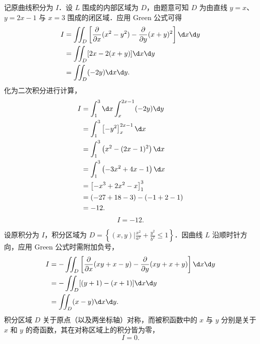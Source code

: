 \begin{solution}

    记原曲线积分为 $I$．设 $L$ 围成的内部区域为 $D$，由题意可知 $D$ 为由直线 $y=x$、$y=2x-1$ 与 $x=3$ 围成的闭区域．应用 Green 公式可得
    \begin{equation}
        \begin{aligned}
            I & = \iint_D \left[ \frac{\partial}{\partial x}(x^2-y^2) - \frac{\partial}{\partial y}(x+y)^2 \right] \d x \d y \\
              & = \iint_D [2x - 2(x+y)] \d x \d y                                                                            \\
              & = \iint_D (-2y) \d x \d y.
        \end{aligned}
    \end{equation}
    化为二次积分进行计算，
    \begin{equation}
        \begin{aligned}
            I & = \int_1^3 \d x \int_x^{2x-1} (-2y) \d y      \\
              & = \int_1^3 \left[ -y^2 \right]_x^{2x-1} \d x  \\
              & = \int_1^3 \left( x^2 - (2x-1)^2 \right) \d x \\
              & = \int_1^3 \left( -3x^2 + 4x - 1 \right) \d x \\
              & = \left[ -x^3 + 2x^2 - x \right]_1^3          \\
              & = (-27 + 18 - 3) - (-1 + 2 - 1)               \\
              & = -12.
        \end{aligned}
    \end{equation}
    \begin{equation}
        I = \boxed{-12}.
    \end{equation}


    设原积分为 $I$，积分区域为 $D = \left\{ (x, y) \mathrel{\big|} \frac{x^2}{a^2} + \frac{y^2}{b^2} \le 1 \right\}$．因曲线 $L$ 沿顺时针方向，应用 Green 公式时需附加负号，
    \begin{equation}
        \begin{aligned}
            I & = -\iint_D \left[ \frac{\partial}{\partial x}(xy+x-y) - \frac{\partial}{\partial y}(xy+x+y) \right] \d x \d y \\
              & = -\iint_D [ (y+1) - (x+1) ] \d x \d y                                                                        \\
              & = \iint_D (x-y) \d x \d y.
        \end{aligned}
    \end{equation}
    积分区域 $D$ 关于原点（以及两坐标轴）对称，而被积函数中的 $x$ 与 $y$ 分别是关于 $x$ 和 $y$ 的奇函数，其在对称区域上的积分皆为零，
    \begin{equation}
        I = \boxed{0}.
    \end{equation}


\end{solution}
